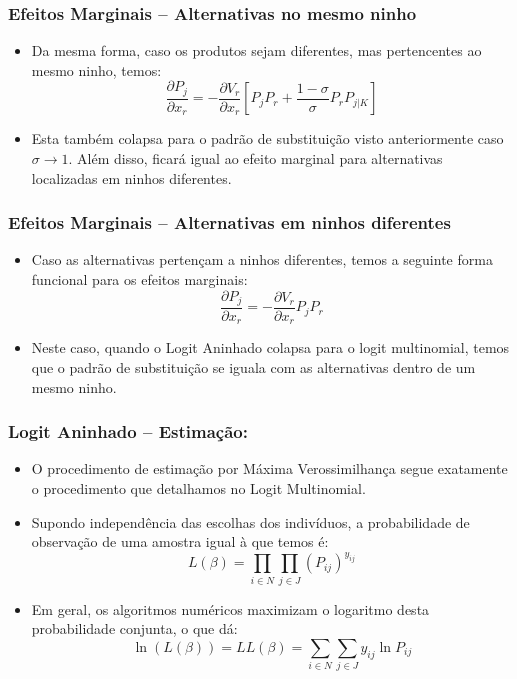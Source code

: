 \documentclass{beamer}
\begin{document}
\begin{frame}\frametitle{Efeitos Marginais -- Alternativas no mesmo ninho}

\begin{itemize}
\item Da mesma forma, caso os produtos sejam diferentes, mas pertencentes
ao mesmo ninho, temos:
\[
\frac{\partial P_{j}}{\partial x_{r}}=-\frac{\partial V_{r}}{\partial x_{r}}\left[P_{j}P_{r}+\frac{1-\sigma}{\sigma}P_{r}P_{j|K}\right]
\]
\item Esta também colapsa para o padrão de substituição visto anteriormente
caso $\sigma\rightarrow1$. Além disso, ficará igual ao efeito marginal
para alternativas localizadas em ninhos diferentes.
\end{itemize}
\end{frame}

\begin{frame}\frametitle{Efeitos Marginais -- Alternativas em ninhos diferentes}

\begin{itemize}
\item Caso as alternativas pertençam a ninhos diferentes, temos a seguinte
forma funcional para os efeitos marginais:
\[
\frac{\partial P_{j}}{\partial x_{r}}=-\frac{\partial V_{r}}{\partial x_{r}}P_{j}P_{r}
\]
\item Neste caso, quando o Logit Aninhado colapsa para o logit multinomial,
temos que o padrão de substituição se iguala com as alternativas dentro
de um mesmo ninho.
\end{itemize}
\end{frame}


\begin{frame}\frametitle{Logit Aninhado -- Estimação:}

\begin{itemize}
\item O procedimento de estimação por Máxima Verossimilhança segue exatamente
o procedimento que detalhamos no Logit Multinomial.
\item Supondo independência das escolhas dos indivíduos, a probabilidade
de observação de uma amostra igual à que temos é:
\[
L(\beta)=\prod_{i\in N}\prod_{j\in J}(P_{ij})^{y_{ij}}
\]
\item Em geral, os algoritmos numéricos maximizam o logaritmo desta probabilidade
conjunta, o que dá:
\[
\ln(L(\beta))=LL(\beta)=\sum_{i\in N}\sum_{j\in J}y_{ij}\ln P_{ij}
\]
\end{itemize}
\end{frame}
\end{document}
